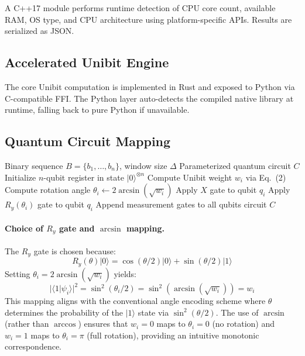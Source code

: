 ﻿\documentclass[12pt,a4paper]{article}
\begin{document}
A C++17 module performs runtime detection of CPU core count, available RAM, OS type, and CPU architecture using platform-specific APIs. Results are serialized as JSON.

\subsection{Accelerated Unibit Engine}

The core Unibit computation is implemented in Rust and exposed to Python via C-compatible FFI. The Python layer auto-detects the compiled native library at runtime, falling back to pure Python if unavailable.

\subsection{Quantum Circuit Mapping}\label{sec:mapping}

\begin{algorithm}[H]
\caption{Unibit-to-Quantum Circuit Mapping}
\label{alg:mapping}
\begin{algorithmic}[1]
\Require Binary sequence $B = \{b_1, \dots, b_n\}$, window size $\Delta$
\Ensure Parameterized quantum circuit $C$
\State Initialize $n$-qubit register in state $|0\rangle^{\otimes n}$
    \State Compute Unibit weight $w_i$ via Eq.~(2)
    \State Compute rotation angle $\theta_i \leftarrow 2\arcsin(\sqrt{w_i})$
        \State Apply $X$ gate to qubit $q_i$
    \EndIf
    \State Apply $R_y(\theta_i)$ gate to qubit $q_i$
\EndFor
\State Append measurement gates to all qubits
\State \Return circuit $C$
\end{algorithmic}
\end{algorithm}

\paragraph{Choice of $R_y$ gate and $\arcsin$ mapping.} The $R_y$ gate is chosen because:
\begin{equation}
    R_y(\theta)|0\rangle = \cos(\theta/2)|0\rangle + \sin(\theta/2)|1\rangle
\end{equation}
Setting $\theta_i = 2\arcsin(\sqrt{w_i})$ yields:
\begin{equation}
    |\langle 1|\psi_i\rangle|^2 = \sin^2(\theta_i/2) = \sin^2(\arcsin(\sqrt{w_i})) = w_i
\end{equation}
This mapping aligns with the conventional angle encoding scheme where $\theta$ determines the probability of the $|1\rangle$ state via $\sin^2(\theta/2)$. The use of $\arcsin$ (rather than $\arccos$) ensures that $w_i = 0$ maps to $\theta_i = 0$ (no rotation) and $w_i = 1$ maps to $\theta_i = \pi$ (full rotation), providing an intuitive monotonic correspondence.
\end{document}
